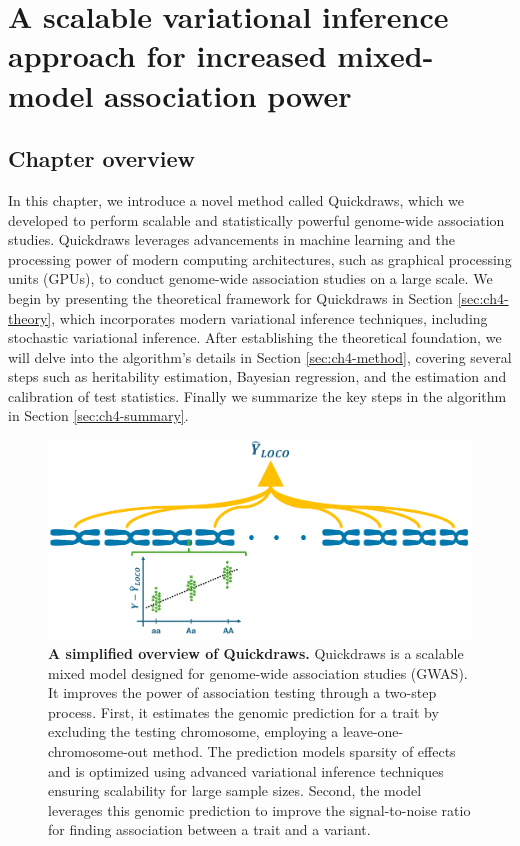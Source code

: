 \chapter{\label{ch:4-qd-method}A scalable variational inference approach for increased mixed-model association power}

\minitoc

\section{Chapter overview}
In this chapter, we introduce a novel method called Quickdraws, which we developed to perform scalable and statistically powerful genome-wide association studies. Quickdraws leverages advancements in machine learning and the processing power of modern computing architectures, such as graphical processing units (GPUs), to conduct genome-wide association studies on a large scale. We begin by presenting the theoretical framework for Quickdraws in Section \ref{sec:ch4-theory}, which incorporates modern variational inference techniques, including stochastic variational inference. After establishing the theoretical foundation, we will delve into the algorithm's details in Section \ref{sec:ch4-method}, covering several steps such as heritability estimation, Bayesian regression, and the estimation and calibration of test statistics. Finally we summarize the key steps in the algorithm in Section \ref{sec:ch4-summary}.

\begin{figure}[h!]
    \centering
    \includegraphics[width=\textwidth]{figures/thesis_qd_simplified_overview.pdf}
    \caption{\textbf{A simplified overview of Quickdraws.} Quickdraws is a scalable mixed model designed for genome-wide association studies (GWAS). It improves the power of association testing through a two-step process. First, it estimates the genomic prediction for a trait by excluding the testing chromosome, employing a leave-one-chromosome-out method. The prediction models sparsity of effects and is optimized using advanced variational inference techniques ensuring scalability for large sample sizes. Second, the model leverages this genomic prediction to improve the signal-to-noise ratio for finding association between a trait and a variant.}
    \label{fig:qd-simplified-overview}
\end{figure}

